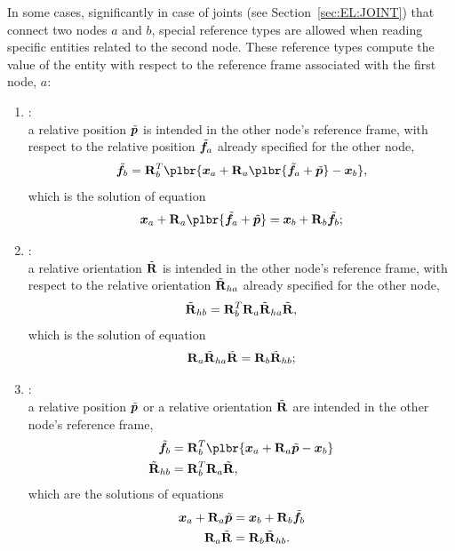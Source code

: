 In some cases, significantly in case of joints (see Section~\ref{sec:EL:JOINT}) that connect two nodes
$a$ and $b$, special reference types are allowed
when reading specific entities related to the second node.
These reference types compute the value of the entity with respect
to the reference frame associated with the first node, $a$:
\begin{enumerate}
\item {}: \\
	a relative position $\tilde{\boldsymbol{p}}$ is intended in the other node's
	reference frame, with respect to the relative position $\tilde{\boldsymbol{f}}_a$
	already specified for the other node,
\begin{equation}
	\tilde{\T{f}}_b = \TT{R}_b^T\plbr{
		\T{x}_a + \TT{R}_a \plbr{
			\tilde{\T{f}}_a
			+ \tilde{\T{p}}
		}
		- \T{x}_b
	} ,
\end{equation}
	which is the solution of equation
\begin{equation}
	\T{x}_a + \TT{R}_a \plbr{\tilde{\T{f}}_a + \tilde{\T{p}}}
	= \T{x}_b + \TT{R}_b \tilde{\T{f}}_b ;
\end{equation}

\item {}: \\
	a relative orientation $\tilde{\bm{\mathbf R}} $ is intended in the other node's
	reference frame, with respect to the relative orientation
	$\tilde{\bm{\mathbf R}}_{ha}$ already specified for the other node,
\begin{equation}
	\tilde{\bm{\mathbf R}}_{hb} = \bm{\mathbf R}_b^T \bm{\mathbf R}_a \tilde{\bm{\mathbf R}}_{ha} \tilde{\bm{\mathbf R}} ,
\end{equation}
	which is the solution of equation
\begin{equation}
	\bm{\mathbf R}_a \tilde{\bm{\mathbf R}}_{ha} \tilde{\bm{\mathbf R}}
	= \bm{\mathbf R}_b \tilde{\bm{\mathbf R}}_{hb} ;
\end{equation}

\item {}: \\
	a relative position $\tilde{\boldsymbol{p}}$
	or a relative orientation $\tilde{\bm{\mathbf R}}$
	are intended in the other node's reference frame,
\begin{subequations}
\begin{align}
	\tilde{\T{f}}_b &= \TT{R}_b^T\plbr{
		\T{x}_a + \TT{R}_a \tilde{\T{p}}
		- \T{x}_b
	} \\
	\tilde{\TT{R}}_{hb} &= \TT{R}_b^T \TT{R}_a \tilde{\TT{R}} ,
\end{align}
\end{subequations}
	which are the solutions of equations
\begin{subequations}
\begin{align}
	\boldsymbol{x}_a + \bm{\mathbf R}_a \tilde{\boldsymbol{p}}
	&= \boldsymbol{x}_b + \bm{\mathbf R}_b \tilde{\boldsymbol{f}}_b \\
	\bm{\mathbf R}_a \tilde{\bm{\mathbf R}}
	&= \bm{\mathbf R}_b \tilde{\bm{\mathbf R}}_{hb} .
\end{align}
\end{subequations}
\end{enumerate}

